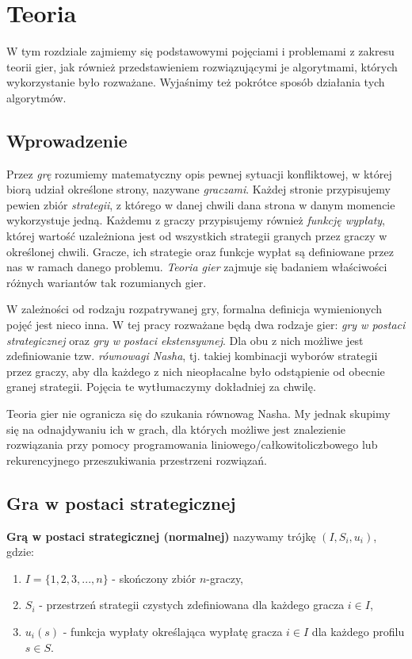 \documentclass[polish]{standalone}
\begin{document}
\pagestyle{headings}

\chapter{Teoria}

W tym rozdziale zajmiemy się podstawowymi pojęciami i problemami z zakresu teorii gier, jak również przedstawieniem
rozwiązującymi je algorytmami, których wykorzystanie było rozważane. Wyjaśnimy też pokrótce sposób działania tych
algorytmów.

\section{Wprowadzenie}

Przez \textit{grę} rozumiemy matematyczny opis pewnej sytuacji konfliktowej, w której biorą udział określone strony,
nazywane \textit{graczami}. Każdej stronie przypisujemy pewien zbiór \textit{strategii}, z którego w danej chwili dana
strona w danym momencie wykorzystuje jedną. Każdemu z graczy przypisujemy również \textit{funkcję wypłaty}, której
wartość uzależniona jest od wszystkich strategii granych przez graczy w określonej chwili. Gracze, ich strategie oraz
funkcje wypłat są definiowane przez nas w ramach danego problemu. \textit{Teoria gier} zajmuje się badaniem właściwości
różnych wariantów tak rozumianych gier.

W zależności od rodzaju rozpatrywanej gry, formalna definicja wymienionych pojęć jest nieco inna. W tej pracy rozważane
będą dwa rodzaje gier: \textit{gry w postaci strategicznej} oraz \textit{gry w postaci ekstensywnej}. Dla obu z nich
możliwe jest zdefiniowanie tzw. \textit{równowagi Nasha}, tj. takiej kombinacji wyborów strategii przez graczy, aby dla
każdego z nich nieopłacalne było odstąpienie od obecnie granej strategii. Pojęcia te wytłumaczymy dokładniej za chwilę.

Teoria gier nie ogranicza się do szukania równowag Nasha. My jednak skupimy się na odnajdywaniu ich w grach, dla
których możliwe jest znalezienie rozwiązania przy pomocy programowania liniowego/całkowitoliczbowego lub rekurencyjnego
przeszukiwania przestrzeni rozwiązań.

\section{Gra w postaci strategicznej}

\begin{definition}
\textbf{Grą w postaci strategicznej (normalnej)} nazywamy trójkę
$(I, S_i, u_i)$, gdzie:
\begin{enumerate}
\item $I = \{ 1, 2, 3, ..., n \}$ - skończony zbiór $n$-graczy,
\item $S_i$ - przestrzeń strategii czystych zdefiniowana dla każdego gracza $i \in I$,
\item $u_i(s)$ - funkcja wypłaty określająca wypłatę gracza $i \in I$ dla każdego profilu
$s \in S$.
\end{enumerate}
\cite[str.~4]{FT-GT}
\end{definition}
\end{document}
